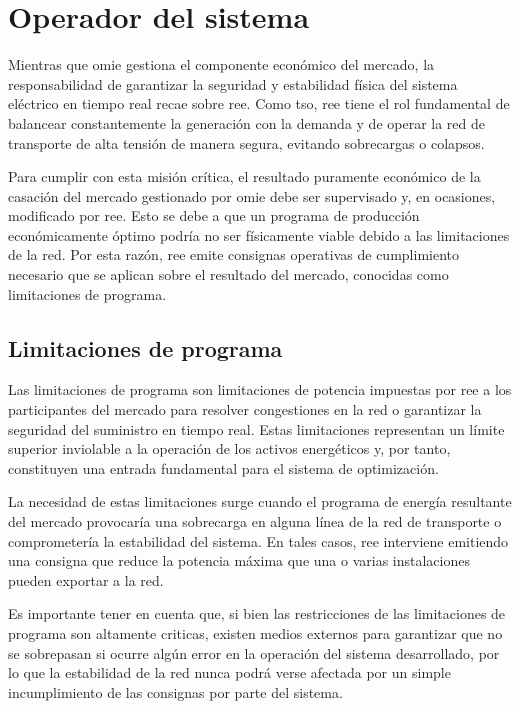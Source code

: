 \section{Operador del sistema}%
\label{makereference4.2}

Mientras que \gls{omie} gestiona el componente económico del mercado, la responsabilidad de garantizar la seguridad y estabilidad física del sistema eléctrico en tiempo real recae sobre \gls{ree}. Como \gls{tso}, \gls{ree} tiene el rol fundamental de balancear constantemente la generación con la demanda y de operar la red de transporte de alta tensión de manera segura, evitando sobrecargas o colapsos.

Para cumplir con esta misión crítica, el resultado puramente económico de la casación del mercado gestionado por \gls{omie} debe ser supervisado y, en ocasiones, modificado por \gls{ree}. Esto se debe a que un programa de producción económicamente óptimo podría no ser físicamente viable debido a las limitaciones de la red. Por esta razón, \gls{ree} emite consignas operativas de cumplimiento necesario que se aplican sobre el resultado del mercado, conocidas como limitaciones de programa.

\subsection{Limitaciones de programa}%
\label{makereference4.2.1}

Las limitaciones de programa son limitaciones de potencia impuestas por \gls{ree} a los participantes del mercado para resolver congestiones en la red o garantizar la seguridad del suministro en tiempo real. Estas limitaciones representan un límite superior inviolable a la operación de los activos energéticos y, por tanto, constituyen una entrada fundamental para el sistema de optimización.

La necesidad de estas limitaciones surge cuando el programa de energía resultante del mercado provocaría una sobrecarga en alguna línea de la red de transporte o comprometería la estabilidad del sistema. En tales casos, \gls{ree} interviene emitiendo una consigna que reduce la potencia máxima que una o varias instalaciones pueden exportar a la red.

Es importante tener en cuenta que, si bien las restricciones de las limitaciones de programa son altamente criticas, existen medios externos para garantizar que no se sobrepasan si ocurre algún error en la operación del sistema desarrollado, por lo que la estabilidad de la red nunca podrá verse afectada por un simple incumplimiento de las consignas por parte del sistema.

